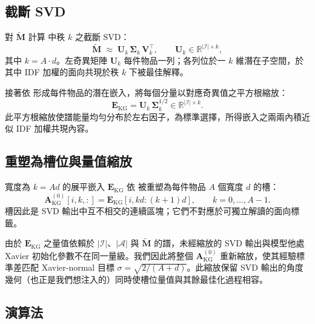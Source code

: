 \subsection{截斷 SVD}
\label{sec:kgsvd-svd-zh}

對 $\tilde{\mathbf{M}}$ 計算  中秩 $k$ 之截斷 SVD：
\begin{equation}
\label{eq:svd-zh}
\tilde{\mathbf{M}} \;\approx\; \mathbf{U}_k\, \boldsymbol{\Sigma}_k\, \mathbf{V}_k^{\top}, \qquad \mathbf{U}_k \in \mathbb{R}^{|\mathcal{I}| \times k},
\end{equation}
其中 $k = A \cdot d$。左奇異矩陣 $\mathbf{U}_k$ 每件物品一列；各列位於一 $k$ 維潛在子空間，於其中 IDF 加權的面向共現於秩 $k$ 下被最佳解釋。

接著依  形成每件物品的潛在嵌入，將每個分量以對應奇異值之平方根縮放：
\begin{equation}
\label{eq:svd-embed-zh}
\mathbf{E}_{\mathrm{KG}} = \mathbf{U}_k\, \boldsymbol{\Sigma}_k^{1/2} \in \mathbb{R}^{|\mathcal{I}| \times k}.
\end{equation}
此平方根縮放使譜能量均勻分布於左右因子，為標準選擇，所得嵌入之兩兩內積近似 IDF 加權共現內容。

\subsection{重塑為槽位與量值縮放}
\label{sec:kgsvd-reshape-zh}

寬度為 $k = A d$ 的展平嵌入 $\mathbf{E}_{\mathrm{KG}}$ 依  被重塑為每件物品 $A$ 個寬度 $d$ 的槽：
\begin{equation}
\label{eq:reshape-zh}
\mathbf{A}_{\mathrm{KG}}^{(0)}[i, k, :] = \mathbf{E}_{\mathrm{KG}}[i, k d : (k+1) d], \qquad k = 0, \dots, A-1.
\end{equation}
槽因此是 SVD 輸出中互不相交的連續區塊；它們不對應於可獨立解讀的面向標籤。

由於 $\mathbf{E}_{\mathrm{KG}}$ 之量值依賴於 $|\mathcal{I}|$、$|\mathcal{A}|$ 與 $\tilde{\mathbf{M}}$ 的譜，未經縮放的 SVD 輸出與模型他處 Xavier 初始化參數不在同一量級。我們因此將整個 $\mathbf{A}_{\mathrm{KG}}^{(0)}$ 重新縮放，使其經驗標準差匹配 Xavier-normal 目標 $\sigma = \sqrt{2 / (A + d)}$。此縮放保留 SVD 輸出的角度幾何（也正是我們想注入的）同時使槽位量值與其餘最佳化過程相容。

\subsection{演算法}
\label{sec:kgsvd-algo-zh}

